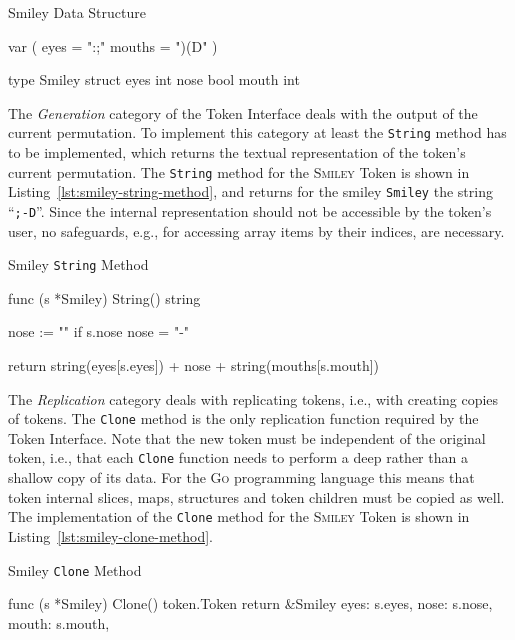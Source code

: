 \begin{listing}
\caption{Smiley Data Structure}
\label{lst:smiley-data-structure}
\begin{gocode}
var (
	eyes   = ":;"
	mouths = ")(D"
)

type Smiley struct {
	eyes  int
	nose  bool
	mouth int
}
\end{gocode}
\end{listing}

The \textit{Generation} category of the Token Interface deals with the output of the current permutation. To implement this category at least the \texttt{String} method has to be implemented, which returns the textual representation of the token's current permutation. The \texttt{String} method for the \textsc{Smiley} Token is shown in Listing~\ref{lst:smiley-string-method}, and returns for the smiley \texttt{Smiley} the string \enquote{\texttt{;-D}}. Since the internal representation should not be accessible by the token's user, no safeguards, e.g., for accessing array items by their indices, are necessary.

\begin{listing}
\caption{Smiley \texttt{String} Method}
\label{lst:smiley-string-method}
\begin{gocode}
func (s *Smiley) String() string {
	nose := ""
	if s.nose {
		nose = "-"
	}

	return string(eyes[s.eyes]) + nose + string(mouths[s.mouth])
}
\end{gocode}
\end{listing}

The \textit{Replication} category deals with replicating tokens, i.e., with creating copies of tokens. The \texttt{Clone} method is the only replication function required by the Token Interface. Note that the new token must be independent of the original token, i.e., that each \texttt{Clone} function needs to perform a deep rather than a shallow copy of its data. For the \textsc{Go} programming language this means that token internal slices, maps, structures and token children must be copied as well. The implementation of the \texttt{Clone} method for the \textsc{Smiley} Token is shown in Listing~\ref{lst:smiley-clone-method}.

\begin{listing}
\caption{Smiley \texttt{Clone} Method}
\label{lst:smiley-clone-method}
\begin{gocode}
func (s *Smiley) Clone() token.Token {
	return &Smiley{
		eyes:  s.eyes,
		nose:  s.nose,
		mouth: s.mouth,
	}
}
\end{gocode}
\end{listing}

